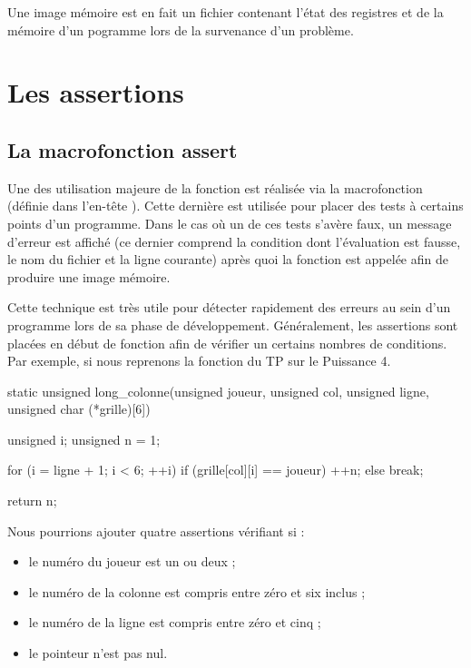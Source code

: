 \begin{infobox} 
 Une image mémoire est en fait un
fichier contenant l'état des registres et de la mémoire d'un pogramme
lors de la survenance d'un problème.
\end{infobox}  


\section{Les assertions}  
\label{les-assertions}

\subsection{La macrofonction assert}
\label{la-macrofonction-assert}

Une des utilisation majeure de la fonction  est réalisée
via la macrofonction  (définie dans l'en-tête
). Cette dernière est utilisée
pour placer des tests à certains points d'un programme. Dans le cas où
un de ces tests s'avère faux, un message d'erreur est affiché (ce
dernier comprend la condition dont l'évaluation est fausse, le nom du
fichier et la ligne courante) après quoi la fonction 
est appelée afin de produire une image mémoire.

Cette technique est très utile pour détecter rapidement des erreurs au
sein d'un programme lors de sa phase de développement. Généralement, les
assertions sont placées en début de fonction afin de vérifier un
certains nombres de conditions. Par exemple, si nous reprenons la
fonction  du TP sur le Puissance 4.

\begin{C}
static unsigned long_colonne(unsigned joueur, unsigned col, unsigned ligne, unsigned char (*grille)[6])
{
    unsigned i;
    unsigned n = 1;

    for (i = ligne + 1; i < 6; ++i)
    {
        if (grille[col][i] == joueur)
            ++n;
        else
            break;
    }

    return n;
}
\end{C}

Nous pourrions ajouter quatre assertions vérifiant si :

\begin{itemize}
\item
  le numéro du joueur est un ou deux ;
\item
  le numéro de la colonne est compris entre zéro et six inclus ;
\item
  le numéro de la ligne est compris entre zéro et cinq ;
\item
  le pointeur  n'est pas nul.
\end{itemize}

